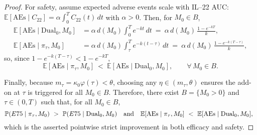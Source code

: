 \begin{proof}
For safety, assume expected adverse events scale with IL--22 AUC: $\mathbb{E}[\mathrm{AEs}\mid C_{22}]=\alpha\int_0^T C_{22}(t)\,dt$ with $\alpha>0$. Then, for $M_0\in B$,
\[
\begin{aligned}
\mathbb{E}[\mathrm{AEs}\mid \mathrm{Dual}_0,M_0]&=\alpha\,d(M_0)\int_0^T e^{-kt}\,dt\ =\ \alpha\,d(M_0)\,\frac{1-e^{-kT}}{k},\\
\mathbb{E}[\mathrm{AEs}\mid \pi_{\tau},M_0]&=\alpha\,d(M_0)\int_{\tau}^T e^{-k(t-\tau)}\,dt\ =\ \alpha\,d(M_0)\,\frac{1-e^{-k(T-\tau)}}{k},
\end{aligned}
\]
so, since $1-e^{-k(T-\tau)}<1-e^{-kT}$,
\[
\mathbb{E}[\mathrm{AEs}\mid \pi_{\tau},M_0]\ <\ \mathbb{E}[\mathrm{AEs}\mid \mathrm{Dual}_0,M_0],\qquad \forall\,M_0\in B.
\]

Finally, because $m_{\tau}=\kappa_0\varphi(\tau)<\theta$, choosing any $\eta\in(m_{\tau},\theta)$ ensures the add-on at $\tau$ is triggered for all $M_0\in B$. Therefore, there exist $B=\{M_0>0\}$ and $\tau\in(0,T)$ such that, for all $M_0\in B$,
\[
\mathbb{P}(E75\mid \pi_{\tau},M_0)\ >\ \mathbb{P}(E75\mid \mathrm{Dual}_0,M_0)
\quad\text{and}\quad
\mathbb{E}[\mathrm{AEs}\mid \pi_{\tau},M_0]\ <\ \mathbb{E}[\mathrm{AEs}\mid \mathrm{Dual}_0,M_0],\ \qedhere
\]
which is the asserted pointwise strict improvement in both efficacy and safety.
\end{proof}
